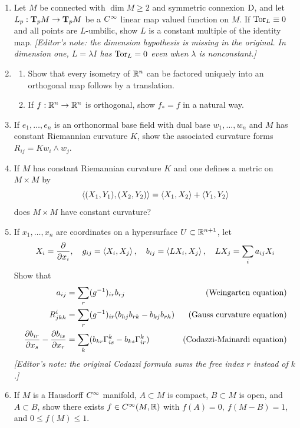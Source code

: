 \documentclass[../main]{subfiles}
\begin{document}
\begin{enumerate}
\item\label{pro:58} Let $M$ be connected with $\dim M\ge2$ and symmetric connexion $\D$, and let $L_p:\ts Mp\functionMaps\ts Mp$ be a $\CInfty$ linear map valued function on $M$. If $\Tor_L\equiv0$ and all points are $L$-umbilic, show $L$ is a constant multiple of the identity map. \emph{[Editor's note: the dimension hypothesis is missing in the original. In dimension one, $L=\lambda I$ has $\Tor_L=0$ even when $\lambda$ is nonconstant.]}

\item\label{pro:59} 
\begin{enumerate}[label=(\roman*)]
    \item Show that every isometry of $\bR^n$ can be factored uniquely into an orthogonal map follows by a translation.
    \item  If $f:\bR^n\functionMaps\bR^n$ is orthogonal, show $f_*=f$ in a natural way.

\end{enumerate}

\item\label{pro:60} If $e_1,\ldots,e_n$ is an orthonormal base field with dual base $w_1,\ldots,w_n$ and $M$ has constant Riemannian curvature $K$, show the associated curvature forms $R_{ij}=Kw_i\wedge w_j$.

\item\label{pro:61} If $M$ has constant Riemannian curvature $K$ and one defines a metric on $M\times M$ by
\[\ip{(X_1,Y_1)}{(X_2,Y_2)} = \ip{X_1}{X_2} + \ip{Y_1}{Y_2}\]
does $M\times M$ have constant curvature?

\item\label{pro:62} If $x_1,\ldots,x_n$ are coordinates on a hypersurface $U\subset\bR^{n+1}$, let
\[X_i = \pdv{}{x_i},
\quad g_{ij} = \ip{X_i}{X_j},
\quad b_{ij} = \ip{LX_i}{X_j},
\quad LX_j=\sum_i a_{ij}X_i\]
Show that
\begin{align*}
a_{ij} &= \sum_r(g\inv)_{ir}b_{rj} & \text{(Weingarten equation)}\index{Weingarten map}\\
R_{jkh}^i &= \sum_r(g\inv)_{ir}(b_{hj}b_{rk}-b_{kj}b_{rh}) & \text{(Gauss curvature equation)}\\
\pdv{b_{ir}}{x_s} - \pdv{b_{is}}{x_r} &= \sum_k(b_{kr}\Gamma_{is}^k - b_{ks}\Gamma_{ir}^k) & \text{(Codazzi-Mainardi equation)}
\end{align*}
\emph{[Editor's note: the original Codazzi formula sums the free index $r$ instead of $k$.]}

\item\label{pro:63} If $M$ is a Hausdorff $\CInfty$ manifold, $A\subset M$ is compact, $B\subset M$ is open, and $A\subset B$, show there exists $f\in\CInfty(M,\bR)$ with $f(A)=0,~f(M-B)=1$, and $0\le f(M)\le 1$.

\end{enumerate}
\end{document}
